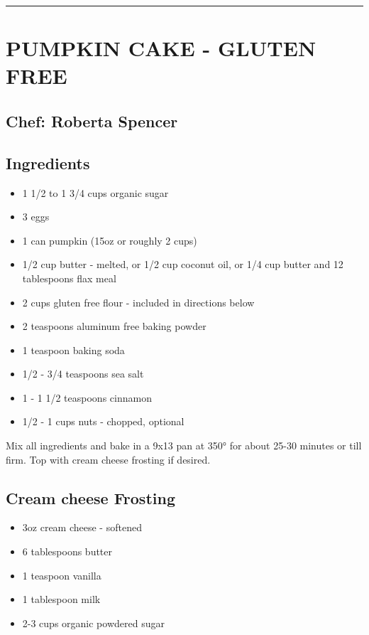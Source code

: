 \documentclass[
]{book}
\providecommand{\tightlist}{%
  \setlength{\itemsep}{0pt}\setlength{\parskip}{0pt}}
\begin{document}
\begin{center}\rule{0.5\linewidth}{0.5pt}\end{center}

\hypertarget{pumpkin-cake---gluten-free}{%
\section*{PUMPKIN CAKE - GLUTEN FREE}\label{pumpkin-cake---gluten-free}}


\hypertarget{chef-roberta-spencer-31}{%
\subsection*{Chef: Roberta Spencer}\label{chef-roberta-spencer-31}}


\hypertarget{ingredients-89}{%
\subsection*{Ingredients}\label{ingredients-89}}


\begin{itemize}
\tightlist
\item
  1 1/2 to 1 3/4 cups organic sugar
\item
  3 eggs
\item
  1 can pumpkin (15oz or roughly 2 cups)
\item
  1/2 cup butter - melted, or 1/2 cup coconut oil, or 1/4 cup butter and 12 tablespoons flax meal
\item
  2 cups gluten free flour - included in directions below
\item
  2 teaspoons aluminum free baking powder
\item
  1 teaspoon baking soda
\item
  1/2 - 3/4 teaspoons sea salt
\item
  1 - 1 1/2 teaspoons cinnamon
\item
  1/2 - 1 cups nuts - chopped, optional
\end{itemize}

Mix all ingredients and bake in a 9x13 pan at 350° for about 25-30 minutes or till firm. Top with cream cheese frosting if desired.

\hypertarget{cream-cheese-frosting}{%
\subsection*{Cream cheese Frosting}\label{cream-cheese-frosting}}


\begin{itemize}
\tightlist
\item
  3oz cream cheese - softened
\item
  6 tablespoons butter
\item
  1 teaspoon vanilla
\item
  1 tablespoon milk
\item
  2-3 cups organic powdered sugar
\end{itemize}
\end{document}
